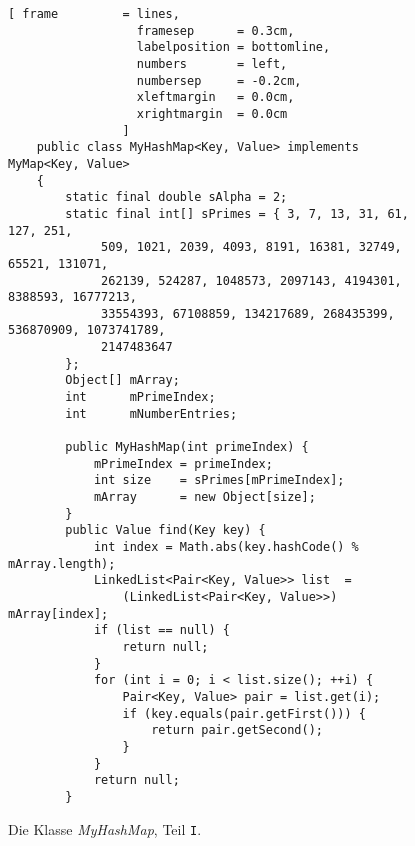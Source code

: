 \begin{figure}[!ht]
  \centering
\begin{Verbatim}[ frame         = lines, 
                  framesep      = 0.3cm, 
                  labelposition = bottomline,
                  numbers       = left,
                  numbersep     = -0.2cm,
                  xleftmargin   = 0.0cm,
                  xrightmargin  = 0.0cm
                ]
    public class MyHashMap<Key, Value> implements MyMap<Key, Value>
    {
        static final double sAlpha = 2;
        static final int[] sPrimes = { 3, 7, 13, 31, 61, 127, 251, 
             509, 1021, 2039, 4093, 8191, 16381, 32749, 65521, 131071, 
             262139, 524287, 1048573, 2097143, 4194301, 8388593, 16777213, 
             33554393, 67108859, 134217689, 268435399, 536870909, 1073741789, 
             2147483647 
        };
        Object[] mArray;
        int      mPrimeIndex;
        int      mNumberEntries;
    
        public MyHashMap(int primeIndex) {
            mPrimeIndex = primeIndex;
            int size    = sPrimes[mPrimeIndex];
            mArray      = new Object[size];
        }
        public Value find(Key key) {
            int index = Math.abs(key.hashCode() % mArray.length);
            LinkedList<Pair<Key, Value>> list  = 
                (LinkedList<Pair<Key, Value>>) mArray[index];
            if (list == null) {
                return null;
            }
            for (int i = 0; i < list.size(); ++i) {
                Pair<Key, Value> pair = list.get(i);
                if (key.equals(pair.getFirst())) {
                    return pair.getSecond();
                }
            }
            return null;
        }
\end{Verbatim}
\vspace*{-0.3cm}
  \caption{Die Klasse \textsl{MyHashMap}, Teil \texttt{I}.}
  \label{fig:MyHashMap-I}
\end{figure}

